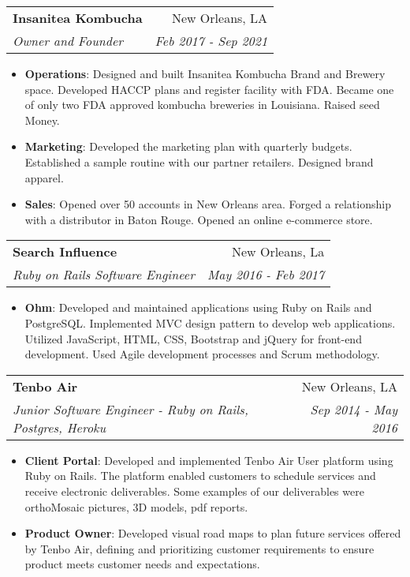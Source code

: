 \documentclass[letterpaper,11pt]{article}
\makeatletter
\newcommand{\resumeItem}[2]{
  \item\small{
    \textbf{#1}{: #2 \vspace{-2pt}}
  }
}
\newcommand{\resumeSubheading}[4]{
  \vspace{-1pt}\item
    \begin{tabular*}{0.97\textwidth}[t]{l@{\extracolsep{\fill}}r}
      \textbf{#1} & #2 \\
      \textit{\small#3} & \textit{\small #4} \\
    \end{tabular*}\vspace{-5pt}
}
\newcommand{\resumeSubSubheading}[2]{
    \begin{tabular*}{0.97\textwidth}{l@{\extracolsep{\fill}}r}
      \textit{\small#1} & \textit{\small #2} \\
    \end{tabular*}\vspace{-5pt}
}
\newcommand{\resumeSubHeadingListEnd}{\end{itemize}}
\newcommand{\resumeItemListStart}{\begin{itemize}}
\newcommand{\resumeItemListEnd}{\end{itemize}\vspace{-5pt}}
\makeatother
\begin{document}

    \resumeSubheading
      {Insanitea Kombucha}{New Orleans, LA}
      {Owner and Founder}{Feb 2017 - Sep 2021}
      \resumeItemListStart
        \resumeItem{Operations}
          {Designed and built Insanitea Kombucha Brand and Brewery space. Developed HACCP plans and register facility with FDA. Became one of only two FDA approved kombucha breweries in Louisiana. Raised seed Money.}
        \resumeItem{Marketing}
          {Developed the marketing plan with quarterly budgets. Established a sample routine with our partner retailers. Designed brand apparel.}
        \resumeItem{Sales}
          {Opened over 50 accounts in New Orleans area. Forged a relationship with a distributor in Baton Rouge. Opened an online e-commerce store.}        
      \resumeItemListEnd

    \resumeSubheading
      {Search Influence}{New Orleans, La}
      {Ruby on Rails Software Engineer}{May 2016 - Feb 2017}
      \resumeItemListStart
        \resumeItem{Ohm}
          {Developed and maintained applications using Ruby on Rails and PostgreSQL. Implemented MVC design pattern to develop web applications. Utilized JavaScript, HTML, CSS, Bootstrap and jQuery for front-end development. Used Agile development processes and Scrum methodology.}
                 
      \resumeItemListEnd

    \resumeSubheading
      {Tenbo Air}{New Orleans, LA}
      { Junior Software Engineer - Ruby on Rails, Postgres, Heroku }{Sep 2014 - May 2016}
      \resumeItemListStart
        \resumeItem{Client Portal}
          {Developed and implemented Tenbo Air User platform using Ruby on Rails. The platform enabled customers to schedule services and receive electronic deliverables. Some examples of our deliverables were orthoMosaic pictures, 3D models, pdf reports. }
        \resumeItem{ Product Owner}
          {Developed visual road maps to plan future services offered by Tenbo Air, defining and prioritizing customer requirements to ensure product meets customer needs and expectations.}
      \resumeItemListEnd
\end{document}
